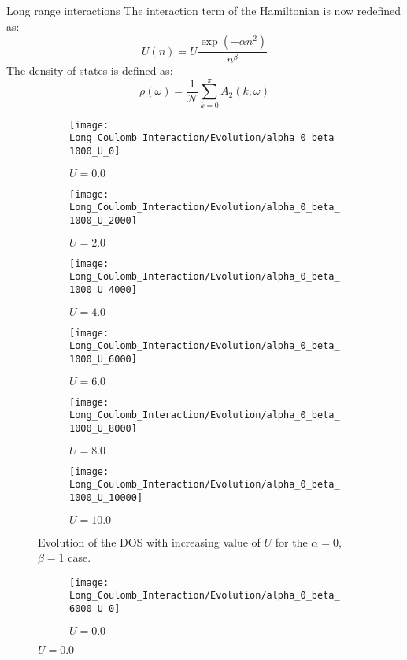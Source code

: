 \documentclass[final]{beamer}
\newlength{\onecolwid}
\begin{document}
\begin{frame}[t]
\begin{columns}[t]
\begin{column}{\onecolwid}
\begin{block}{Long range interactions}
The interaction term of the Hamiltonian is now redefined as:
\begin{equation}\label{eqn:Long_interaction}
U \left( n \right)  = U \frac{\exp(- \alpha n ^ 2)}{n ^ \beta}
\end{equation}
The density of states is defined as:
\begin{equation}\label{eqn:DOS}
\rho \left( \omega \right) = \frac{1}{\mathcal{N}}\sum_{k = 0}^{\pi} A^{}_{2} \left(k, \omega \right)
\end{equation}
\begin{figure}[p!]
	\centering
	\begin{subfigure}{0.3\linewidth}
		\texttt{[image: Long\_Coulomb\_Interaction/Evolution/alpha\_0\_beta\_1000\_U\_0]}
		\caption{$U = 0.0$}
	\end{subfigure}
	\begin{subfigure}{0.3\linewidth}
		\texttt{[image: Long\_Coulomb\_Interaction/Evolution/alpha\_0\_beta\_1000\_U\_2000]}
		\caption{$U = 2.0$}
	\end{subfigure}
	\begin{subfigure}{0.3\linewidth}
		\texttt{[image: Long\_Coulomb\_Interaction/Evolution/alpha\_0\_beta\_1000\_U\_4000]}
		\caption{$U = 4.0$}
	\end{subfigure}
	\begin{subfigure}{0.3\linewidth}
		\texttt{[image: Long\_Coulomb\_Interaction/Evolution/alpha\_0\_beta\_1000\_U\_6000]}
		\caption{$U = 6.0$}
	\end{subfigure}
	\begin{subfigure}{0.3\linewidth}
		\texttt{[image: Long\_Coulomb\_Interaction/Evolution/alpha\_0\_beta\_1000\_U\_8000]}
		\caption{$U = 8.0$}
	\end{subfigure}
	\begin{subfigure}{0.3\linewidth}
		\texttt{[image: Long\_Coulomb\_Interaction/Evolution/alpha\_0\_beta\_1000\_U\_10000]}
		\caption{$U = 10.0$}
	\end{subfigure}
	\caption{Evolution of the DOS with increasing value of $U$ for the $\alpha = 0$, $\beta = 1$ case.}
\end{figure}
\begin{figure}[p!]
	\centering
	\begin{subfigure}{0.3\linewidth}
		\texttt{[image: Long\_Coulomb\_Interaction/Evolution/alpha\_0\_beta\_6000\_U\_0]}
		\caption{$U = 0.0$}

\end{subfigure}
\end{figure}
\end{block}
\end{column}
\end{columns}
\end{frame}
\end{document}
